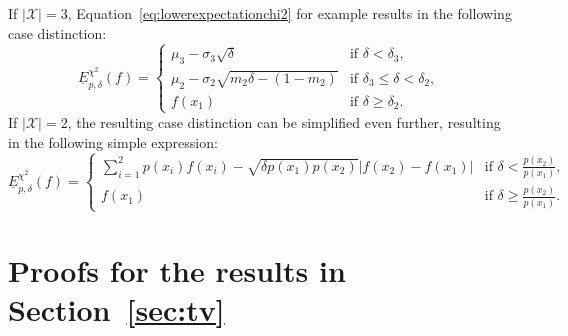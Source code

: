 \documentclass[10pt,a4paper]{amsart}
\begin{document}
If $\vert\mathcal{X}\vert=3$, Equation~\eqref{eq:lowerexpectationchi2} for example results in the following case distinction:
\begin{equation}\label{eq:lowerexpectationchi2three}
    \underline{E}^{\chi^2}_{p,\delta}(f)=
    \begin{cases}
        \mu_3-\sigma_3\sqrt{\delta} & \text{if } \delta<\delta_3,\\
        \mu_2-\sigma_2\sqrt{m_2\delta-(1-m_2)} & \text{if } \delta_3\leq\delta<\delta_2,\\
        f(x_1) & \text{if } \delta\geq\delta_2.
    \end{cases}
\end{equation}
If $\vert\mathcal{X}\vert=2$, the resulting case distinction can be simplified even further, resulting in the following simple expression:
\begin{equation}\label{eq:lowerexpectationchi2two}
    \underline{E}^{\chi^2}_{p,\delta}(f)=
    \begin{cases}
        \displaystyle\sum_{i=1}^2p(x_i)f(x_i)-\sqrt{\delta p(x_1)p(x_2)}\vert f(x_2)-f(x_1)\vert & \text{if } \delta<\frac{p(x_2)}{p(x_1)},\\
        f(x_1) & \text{if } \delta\geq\frac{p(x_2)}{p(x_1)}.
    \end{cases}
\end{equation}

\printbibliography

\appendix

\section{Proofs for the results in Section~\ref{sec:tv}}
\end{document}
